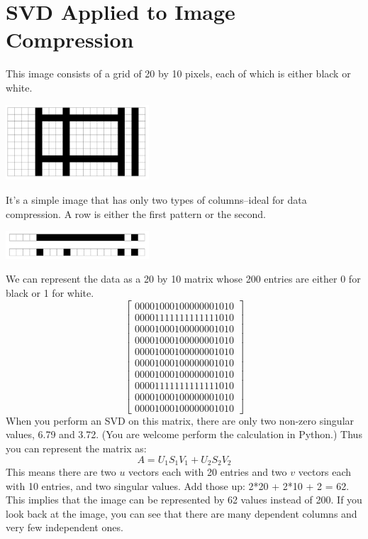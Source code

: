 \section{SVD Applied to Image Compression}
This image consists of a grid of 20 by 10 pixels, each of which is either black or white.

\includegraphics[width=0.4\textwidth]{imagecompress.png}

It's a simple image that has only two types of columns--ideal for data compression. A row is either the first pattern or the second.

\includegraphics[width=0.4\textwidth]{rows.png}

We can represent the data as a 20 by 10 matrix whose 200 entries are either 0 for black or 1 for white. 
$$
\begin{bmatrix}
0 0 0 0 1 0 0 0 1 0 0 0 0 0 0 0 1 0 1 0\\
0 0 0 0 1 1 1 1 1 1 1 1 1 1 1 1 1 0 1 0\\
0 0 0 0 1 0 0 0 1 0 0 0 0 0 0 0 1 0 1 0\\
0 0 0 0 1 0 0 0 1 0 0 0 0 0 0 0 1 0 1 0\\
0 0 0 0 1 0 0 0 1 0 0 0 0 0 0 0 1 0 1 0\\
0 0 0 0 1 0 0 0 1 0 0 0 0 0 0 0 1 0 1 0\\
0 0 0 0 1 0 0 0 1 0 0 0 0 0 0 0 1 0 1 0\\
0 0 0 0 1 1 1 1 1 1 1 1 1 1 1 1 1 0 1 0\\
0 0 0 0 1 0 0 0 1 0 0 0 0 0 0 0 1 0 1 0\\
0 0 0 0 1 0 0 0 1 0 0 0 0 0 0 0 1 0 1 0
\end{bmatrix}
$$
When you perform an SVD on this matrix, there are only two non-zero singular values, 6.79 and 3.72. (You are welcome perform the calculation in Python.) Thus you can represent the matrix as:
$$
A = U_1 S_1 V_1 + U_2 S_2 V_2
$$
This means there are two $u$ vectors each with 20 entries and two $v$ vectors each with 10 entries, and two singular values. Add those up: 2*20 + 2*10 + 2 = 62. This implies that the image can be represented by 62 values instead of 200. If you look back at the image, you can see that there are many dependent columns and very few independent ones. 

